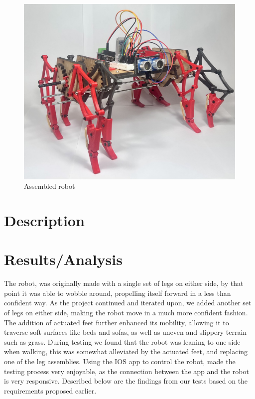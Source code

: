\begin{figure}[!htb]
    \centering
    \includegraphics[width=1\linewidth]{images/Roboty.jpg}
    \caption{Assembled robot}
    \label{fig:robot}
\end{figure}

\section{Description}

\section{Results/Analysis}
The robot, was originally made with a single set of legs on either side, by that point it was able to wobble around, propelling itself forward in a less than confident way. As the project continued and iterated upon, we added another set of legs on either side, making the robot move in a much more confident fashion. The addition of actuated feet further enhanced its mobility, allowing it to traverse soft surfaces like beds and sofas, as well as uneven and slippery terrain such as grass. During testing we found that the robot was leaning to one side when walking, this was somewhat alleviated by the actuated feet, and replacing one of the leg assemblies. Using the IOS app to control the robot, made the testing process very enjoyable, as the connection between the app and the robot is very responsive. Described below are the findings from our tests based on the requirements proposed earlier. \\
